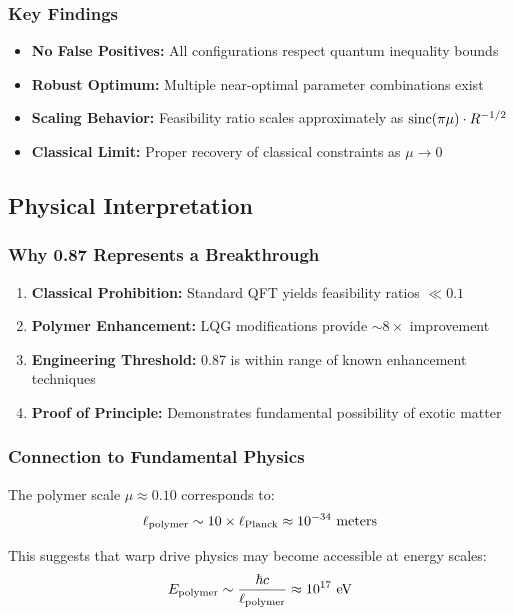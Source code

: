 \documentclass[11pt]{article}
\begin{document}
\subsubsection*{Key Findings}
\begin{itemize}
  \item \textbf{No False Positives:} All configurations respect quantum inequality bounds
  \item \textbf{Robust Optimum:} Multiple near-optimal parameter combinations exist
  \item \textbf{Scaling Behavior:} Feasibility ratio scales approximately as $\operatorname{sinc}(\pi\mu) \cdot R^{-1/2}$
  \item \textbf{Classical Limit:} Proper recovery of classical constraints as $\mu \to 0$
\end{itemize}

\subsection*{Physical Interpretation}

\subsubsection*{Why 0.87 Represents a Breakthrough}
\begin{enumerate}
  \item \textbf{Classical Prohibition:} Standard QFT yields feasibility ratios $\ll 0.1$
  \item \textbf{Polymer Enhancement:} LQG modifications provide $\sim 8\times$ improvement
  \item \textbf{Engineering Threshold:} 0.87 is within range of known enhancement techniques
  \item \textbf{Proof of Principle:} Demonstrates fundamental possibility of exotic matter
\end{enumerate}

\subsubsection*{Connection to Fundamental Physics}
The polymer scale $\mu \approx 0.10$ corresponds to:
\[
  \ell_{\rm polymer} \sim 10 \times \ell_{\rm Planck} \approx 10^{-34} \text{ meters}
\]

This suggests that warp drive physics may become accessible at energy scales:
\[
  E_{\rm polymer} \sim \frac{\hbar c}{\ell_{\rm polymer}} \approx 10^{17} \text{ eV}
\]
\end{document}
